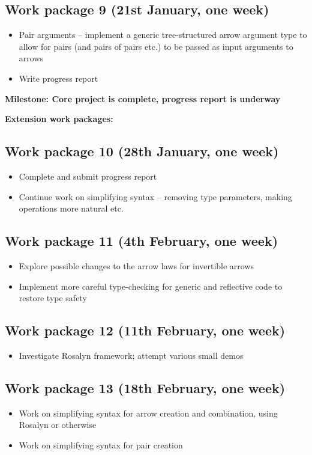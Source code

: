 \documentclass[12pt,a4]{article}
\begin{document}
	\subsection{Work package 9 (21st January, one week)}
		\begin{itemize}
			\item Pair arguments -- implement a generic tree-structured arrow argument type to allow for pairs (and pairs of pairs etc.) to be passed as input arguments to arrows
			\item Write progress report
		\end{itemize}
	
	\noindent \textbf{Milestone: Core project is complete, progress report is underway}
	
	\noindent \textbf{Extension work packages:}
	
	\subsection{Work package 10 (28th January, one week)}
		\begin{itemize}
			\item Complete and submit progress report
			\item Continue work on simplifying syntax -- removing type parameters, making operations more natural etc.
		\end{itemize}
	
	\subsection{Work package 11 (4th February, one week)}
		\begin{itemize}
			\item Explore possible changes to the arrow laws for invertible arrows
			\item Implement more careful type-checking for generic and reflective code to restore type safety
		\end{itemize}
	
	\subsection{Work package 12 (11th February, one week)}
		\begin{itemize}
			\item Investigate Rosalyn framework; attempt various small demos
		\end{itemize}
	
	\subsection{Work package 13 (18th February, one week)}
		\begin{itemize}
			\item Work on simplifying syntax for arrow creation and combination, using Rosalyn or otherwise
			\item Work on simplifying syntax for pair creation
		\end{itemize}
	
\end{document}
